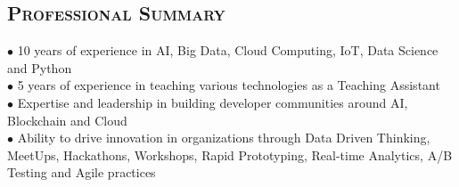 \begin{resume}


\section{\textsc{Professional Summary}}
$\bullet$ 10 years of experience in AI, Big Data, Cloud Computing, IoT, Data Science and Python\\
$\bullet$ 5 years of experience in teaching various technologies as a Teaching Assistant\\
$\bullet$ Expertise and leadership in building developer communities around AI,  Blockchain and Cloud\\
$\bullet$ Ability to drive innovation in organizations through Data Driven Thinking, MeetUps, Hackathons, Workshops, Rapid Prototyping, Real-time Analytics, A/B Testing and Agile practices



\end{resume}
